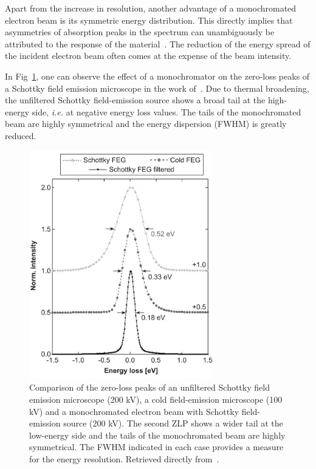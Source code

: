 Apart from the increase in resolution, another advantage of a monochromated 
electron beam is its symmetric energy distribution. 
%
This directly implies that asymmetries of absorption peaks in the spectrum can 
unambiguously be attributed to the response of the material~\cite{Erni:2005}.
%
The reduction of the energy spread of the incident electron beam often 
comes at the expense of the beam intensity. 
%

In Fig~\ref{fig:monochromation}, one can observe the effect of a monochromator 
on the zero-loss peaks of a Schottky field emission microscope in the work of~\cite{Erni:2005}. 
%
Due to thermal broadening, the unfiltered Schottky field-emission source
shows a broad tail at the high-energy side, {\it i.e.} at negative energy loss values.
%
The tails of the monochromated beam are highly symmetrical and the energy dispersion (FWHM)
is greatly reduced.

\begin{figure}[H]
    \centering
    \includegraphics[width=80mm]{plots/monochromator.png}
    \caption{Comparison of the zero-loss peaks of an unfiltered Schottky field emission microscope 
    (200 kV), a cold field-emission microscope (100 kV) and a monochromated electron beam with 
    Schottky field-emission source (200 kV). 
    The second ZLP shows a wider tail at the low-energy side and the tails of the 
    monochromated beam are highly symmetrical. 
    The FWHM indicated in each case provides a measure for the energy resolution.
    Retrieved directly from~\cite{Erni:2005}.}
    \label{fig:monochromation}
\end{figure}


